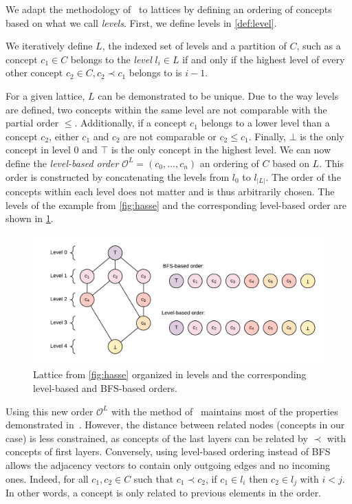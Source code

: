 We adapt the methodology of~\cite{graphrnn:2018:jiaxuan} to lattices by defining an ordering of concepts based on what we call \textit{levels}.
First, we define levels in \cref{def:level}.
\begin{definition}\label{def:level}
We iteratively define $L$, the indexed set of levels and a partition of $C$, such as %
a concept $c_1 \in C$ belongs to the \textit{level} $l_i\in L$ if and only if the highest level of every other concept $c_2 \in C, c_2 \prec c_1$
belongs to  is $i-1$.
\end{definition}
For a given lattice, $L$ can be demonstrated to be unique.
Due to the way levels are defined, two concepts within the same level are not comparable with the partial order $\leq$.
Additionally, if a concept $c_1$ belongs to a lower level than a concept $c_2$, either $c_1$ and $c_2$ are not comparable or $c_2 \leq c_1$.
Finally, $\bot$ is the only concept in level $0$ and $\top$ is the only concept in the highest level.
%
We can now define the \textit{level-based order} $\mathcal{O}^L = (c_0, \dots, c_n)$ an ordering of $C$ based on $L$.
This order is constructed by concatenating the levels from $l_0$ to $l_{|L|}$.
The order of the concepts within each level does not matter and is thus arbitrarily chosen.
The levels of the example from \cref{fig:hasse} and the corresponding level-based order are shown in \cref{fig:level-order}.

\begin{figure}
    \centering
    \includegraphics[keepaspectratio, width=.9\textwidth, height=5cm]{Figures/Ch1/example_order.png}
    \caption{Lattice from \cref{fig:hasse} organized in levels and the corresponding level-based and BFS-based orders.}
    \label{fig:level-order}
\end{figure}

Using this new order $\mathcal{O}^L$ with the method of~\cite{graphrnn:2018:jiaxuan} maintains most of the properties demonstrated in~\cite{graphrnn:2018:jiaxuan}.
However, the distance between related nodes (concepts in our case) is less constrained, as concepts of the last layers can be related by $\prec$ with concepts of first layers.
Conversely, using level-based ordering instead of BFS allows the adjacency vectors to contain only outgoing edges and no incoming ones.
Indeed, for all $c_1, c_2 \in C$ such that $c_1 \prec c_2$, if $c_1 \in l_i$ then $c_2 \in l_j$ with $i < j$.
In other words, a concept is only related to previous elements in the order.

